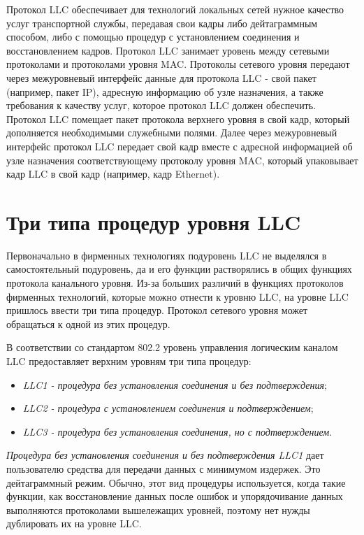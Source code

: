 Протокол LLC обеспечивает для технологий локальных сетей нужное качество услуг транспортной службы, передавая свои кадры либо дейтаграммным способом, либо с помощью процедур с установлением соединения и восстановлением кадров.
Протокол LLC занимает уровень между сетевыми протоколами и протоколами уровня MAC.
Протоколы сетевого уровня передают через межуровневый интерфейс данные для протокола LLC - свой пакет (например, пакет IP), адресную информацию об узле назначения, а также требования к качеству услуг, которое протокол LLC должен обеспечить.
Протокол LLC помещает пакет протокола верхнего уровня в свой кадр, который дополняется необходимыми служебными полями.
Далее через межуровневый интерфейс протокол LLC передает свой кадр вместе с адресной информацией об узле назначения соответствующему протоколу уровня MAC, который упаковывает кадр LLC в свой кадр (например, кадр Ethernet).

\section{Три типа процедур уровня LLC}

Первоначально в фирменных технологиях подуровень LLC не выделялся в самостоятельный подуровень, да и его функции растворялись в общих функциях протокола канального уровня.
Из-за больших различий в функциях  протоколов фирменных технологий, которые можно отнести к уровню LLC, на уровне LLC пришлось ввести три типа процедур.
Протокол сетевого уровня может обращаться к одной из этих процедур.

В соответствии со стандартом 802.2 уровень управления логическим каналом LLC предоставляет верхним уровням три типа процедур:
\begin{itemize}
    \item \emph{LLC1 - процедура без установления соединения и без подтверждения};
    \item \emph{LLC2 - процедура с установлением соединения и подтверждением};
    \item \emph{LLC3 - процедура без установления соединения, но с подтверждением}.
\end{itemize}

\emph{Процедура без установления соединения и без подтверждения LLC1} дает пользователю средства для передачи данных с минимумом издержек.
Это дейтаграммный режим.
Обычно, этот вид процедуры используется, когда такие функции, как восстановление данных после ошибок и упорядочивание данных выполняются протоколами вышележащих уровней, поэтому нет нужды дублировать их на уровне LLC.

